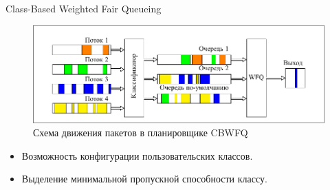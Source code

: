\documentclass[12pt]{beamer}
\begin{document}
\begin{frame}{Class-Based Weighted Fair Queueing}
	\begin{figure}
		\center
    	\includegraphics[scale=0.8]{../text/pdfimages/cbwfq.pdf}
		\caption*{Схема движения пакетов в планировщике CBWFQ}
	\end{figure}

	\begin{center}
{\footnotesize
	\begin{itemize}
		\item Возможность конфигурации пользовательских классов.
		\item Выделение минимальной пропускной способности классу.
	\end{itemize}
}
	\end{center}
\end{frame}
\end{document}
